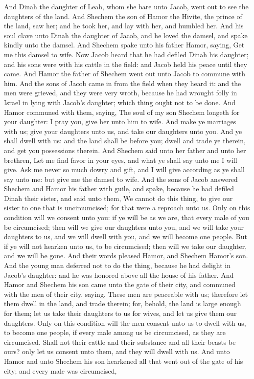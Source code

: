 And Dinah the daughter of Leah, whom she bare unto Jacob, went out to see the daughters of the land. And Shechem the son of Hamor the Hivite, the prince of the land, saw her; and he took her, and lay with her, and humbled her. And his soul clave unto Dinah the daughter of Jacob, and he loved the damsel, and spake kindly unto the damsel. And Shechem spake unto his father Hamor, saying, Get me this damsel to wife. Now Jacob heard that he had defiled Dinah his daughter; and his sons were with his cattle in the field: and Jacob held his peace until they came. And Hamor the father of Shechem went out unto Jacob to commune with him. And the sons of Jacob came in from the field when they heard it: and the men were grieved, and they were very wroth, because he had wrought folly in Israel in lying with Jacob’s daughter; which thing ought not to be done. And Hamor communed with them, saying, The soul of my son Shechem longeth for your daughter: I pray you, give her unto him to wife. And make ye marriages with us; give your daughters unto us, and take our daughters unto you. And ye shall dwell with us: and the land shall be before you; dwell and trade ye therein, and get you possessions therein. And Shechem said unto her father and unto her brethren, Let me find favor in your eyes, and what ye shall say unto me I will give. Ask me never so much dowry and gift, and I will give according as ye shall say unto me: but give me the damsel to wife. And the sons of Jacob answered Shechem and Hamor his father with guile, and spake, because he had defiled Dinah their sister, and said unto them, We cannot do this thing, to give our sister to one that is uncircumcised; for that were a reproach unto us. Only on this condition will we consent unto you: if ye will be as we are, that every male of you be circumcised; then will we give our daughters unto you, and we will take your daughters to us, and we will dwell with you, and we will become one people. But if ye will not hearken unto us, to be circumcised; then will we take our daughter, and we will be gone.  And their words pleased Hamor, and Shechem Hamor’s son. And the young man deferred not to do the thing, because he had delight in Jacob’s daughter: and he was honored above all the house of his father. And Hamor and Shechem his son came unto the gate of their city, and communed with the men of their city, saying, These men are peaceable with us; therefore let them dwell in the land, and trade therein; for, behold, the land is large enough for them; let us take their daughters to us for wives, and let us give them our daughters. Only on this condition will the men consent unto us to dwell with us, to become one people, if every male among us be circumcised, as they are circumcised. Shall not their cattle and their substance and all their beasts be ours? only let us consent unto them, and they will dwell with us. And unto Hamor and unto Shechem his son hearkened all that went out of the gate of his city; and every male was circumcised, 